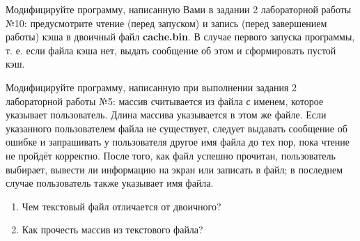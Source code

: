 
\labtask

Модифицируйте программу, написанную Вами в задании 2 лабораторной работы №10: предусмотрите чтение (перед запуском) и запись (перед завершением работы) кэша в двоичный файл \textbf{cache.bin}.
В случае первого запуска программы, т. е. если файла кэша нет, выдать сообщение об этом и сформировать пустой кэш.

\labtask

Модифицируйте программу, написанную при выполнении задания 2 лабораторной работы №5: массив  считывается из файла с именем, которое указывает пользователь.
Длина массива указывается в этом же файле.
Если указанного пользователем файла не существует, следует выдавать сообщение об ошибке и запрашивать у пользователя другое имя файла до тех пор, пока чтение не пройдёт корректно.
После того, как файл успешно прочитан, пользователь выбирает, вывести ли информацию на экран или записать в файл;
в последнем случае пользователь также указывает имя файла.


\labworkquestions

\begin{enumerate}
	\item
		Чем текстовый файл отличается от двоичного?
	\item
		Как прочесть массив из текстового файла?
\end{enumerate}



